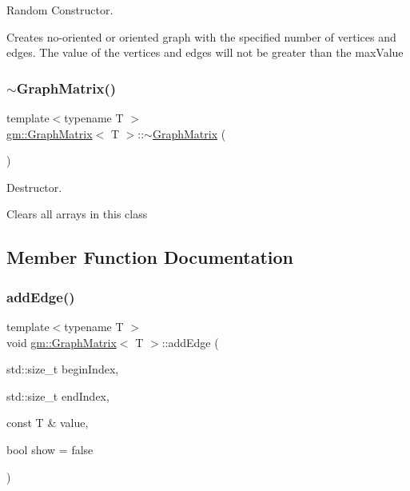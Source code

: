 Random Constructor. 

Creates no-\/oriented or oriented graph with the specified number of vertices and edges. The value of the vertices and edges will not be greater than the \textquotesingle{}max\+Value\textquotesingle{} \mbox{\label{classgm_1_1_graph_matrix_a3b0993020ce3351d0ec4b7fe2adc2580}} 
\subsubsection{\texorpdfstring{$\sim$\+Graph\+Matrix()}{~GraphMatrix()}}
{\footnotesize\ttfamily template$<$typename T $>$ \\
\mbox{\hyperlink{classgm_1_1_graph_matrix}{gm\+::\+Graph\+Matrix}}$<$ T $>$\+::$\sim$\mbox{\hyperlink{classgm_1_1_graph_matrix}{Graph\+Matrix}} (\begin{DoxyParamCaption}{ }\end{DoxyParamCaption})}



Destructor. 

Clears all arrays in this class 

\subsection{Member Function Documentation}
\mbox{\label{classgm_1_1_graph_matrix_a0500fe2b6a585690c33ca4ee182cbdea}} 
\subsubsection{\texorpdfstring{add\+Edge()}{addEdge()}}
{\footnotesize\ttfamily template$<$typename T $>$ \\
void \mbox{\hyperlink{classgm_1_1_graph_matrix}{gm\+::\+Graph\+Matrix}}$<$ T $>$\+::add\+Edge (\begin{DoxyParamCaption}\item[{std\+::size\+\_\+t}]{begin\+Index,  }\item[{std\+::size\+\_\+t}]{end\+Index,  }\item[{const T \&}]{value,  }\item[{bool}]{show = {\ttfamily false} }\end{DoxyParamCaption})}



